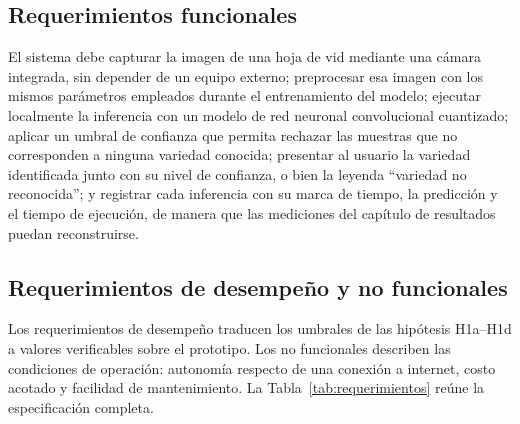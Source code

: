 \subsection{Requerimientos funcionales}

El sistema debe capturar la imagen de una hoja de vid mediante una cámara
integrada, sin depender de un equipo externo; preprocesar esa imagen con los
mismos parámetros empleados durante el entrenamiento del modelo; ejecutar
localmente la inferencia con un modelo de red neuronal convolucional
cuantizado; aplicar un umbral de confianza que permita rechazar las muestras
que no corresponden a ninguna variedad conocida; presentar al usuario la
variedad identificada junto con su nivel de confianza, o bien la leyenda
``variedad no reconocida''; y registrar cada inferencia con su marca de
tiempo, la predicción y el tiempo de ejecución, de manera que las mediciones
del capítulo de resultados puedan reconstruirse.

\subsection{Requerimientos de desempeño y no funcionales}

Los requerimientos de desempeño traducen los umbrales de las hipótesis
H1a--H1d a valores verificables sobre el prototipo. Los no funcionales
describen las condiciones de operación: autonomía respecto de una conexión a
internet, costo acotado y facilidad de mantenimiento. La
Tabla~\ref{tab:requerimientos} reúne la especificación completa.


